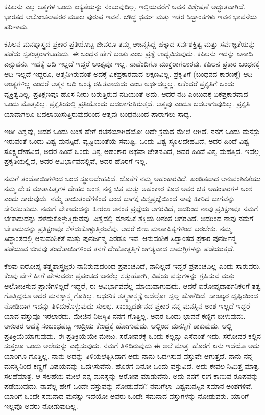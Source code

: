 ಕಪಿಲನು ಎಲ್ಲ ಆತ್ಮಗಳ ಒಂದು ಐಕ್ಯತೆಯನ್ನು ನಂಬುವುದಿಲ್ಲ. ಇಲ್ಲಿಯವರೆಗೆ ಅವನ ವಿಶ್ಲೇಷಣೆ ಅದ್ಭುತವಾಗಿದೆ. ಭಾರತದ ಆಲೋಚನಾಪರರ ಮೂಲ ಪುರುಷ ಇವನೆ. ಬೌದ್ಧ ಧರ್ಮ ಮತ್ತು ಇತರ ಸಿದ್ದಾಂತಗಳು ಇವನ ಭಾವನೆಯ ಪರಿಣಾಮ.

ಕಪಿಲನ ಮನಶ್ಶಾಸ್ತ್ರದ ಪ್ರಕಾರ ಪ್ರತಿಯೊಬ್ಬ ಜೀವರೂ ತಮ್ಮ ಆಜನ್ಮಸಿದ್ದ ಹಕ್ಕಾದ ಸರ್ವಶಕ್ತಿತ್ವ ಮತ್ತು ಸರ್ವಜ್ಞತೆಯನ್ನು ಪಡೆದು ಸ್ವತಂತ್ರರಾಗಬಹುದು. ಈ ಬಂಧನ ಹೇಗೆ ಬಂತು ಎಂಬ ಪ್ರಶ್ನೆ ಉದ್ಭವಿಸುವುದು. ಕಪಿಲನು ಇದನ್ನು ಅನಾದಿ ಎನ್ನುವನು. ಇದಕ್ಕೆ ಆದಿ ಇಲ್ಲದೆ ಇದ್ದರೆ ಅಂತ್ಯವೂ ಇಲ್ಲ. ನಾವೆಂದಿಗೂ ಮುಕ್ತರಾಗಲಾರವು. ಕಪಿಲನ ಪ್ರಕಾರ ಬಂಧನಕ್ಕೆ ಆದಿ ಇಲ್ಲದೆ ಇದ್ದರೂ, ಆತ್ಮನಿಗಿರುವಂತೆ ಅದಕ್ಕೆ ಏಕಪ್ರಕಾರವಾದ ಲಕ್ಷಣವಿಲ್ಲ. ಪ್ರಕೃತಿಗೆ (ಬಂಧನದ ಕಾರಣಕ್ಕೆ) ಆದಿ ಅಂತ್ಯಗಳಿಲ್ಲ ಎಂದರೆ ಆತ್ಮನ ಆದಿ ಅಂತ್ಯ ರಹಿತವಾದುದು ಎಂಬ ಅರ್ಥದಲ್ಲಲ್ಲ. ಏಕೆಂದರೆ ಪ್ರಕೃತಿಗೆ ಒಂದು ವ್ಯಕ್ತಿತ್ವವಿಲ್ಲ. ಪ್ರತಿಕ್ಷಣವೂ ಹೊಸ ನೀರು ಬರುತ್ತಿರುವ ನದಿಯಂತೆ ಅದು. ಆದರೆ ನದಿ ಎಂಬುದಕ್ಕೆ ಏಕಪ್ರಕಾರವಾದ ಒಂದು ಮೊತ್ತವಿಲ್ಲ. ಪ್ರಕೃತಿಯಲ್ಲಿ ಪ್ರತಿಯೊಂದು ಬದಲಾಗುತ್ತಿರುತ್ತದೆ. ಆತ್ಮವು ಎಂದೂ ಬದಲಾಗುವುದಿಲ್ಲ. ಪ್ರಕೃತಿ ಯಾವಾಗಲೂ ಬದಲಾಯಿಸುತ್ತಿರುವುದರಿಂದ ಆತ್ಮವು ಬಂಧನದಿಂದ ಪಾರಾಗಲು ಸಾಧ್ಯ.

ಇಡೀ ವಿಶ್ವವು, ಅದರ ಒಂದು ಅಂಶ ಹೇಗೆ ರಚನೆಯಾಗಿದೆಯೋ ಅದೇ ಕ್ರಮದ ಮೇಲೆ ಆಗಿದೆ. ನನಗೆ ಒಂದು ಮನಸ್ಸು ಇರುವಂತೆ ಒಂದು ವಿಶ್ವ ಮನಸ್ಸಿದೆ. ವ್ಯಷ್ಟಿಯಂತೆಯೆ ಸಮಷ್ಟಿ. ಒಂದು ವಿಶ್ವ ಸ್ಥೂಲದೇಹವಿದೆ, ಅದರ ಹಿಂದೆ ವಿಶ್ವ ಸೂಕ್ಷ್ಮದೇಹವಿದೆ, ಅದರ ಹಿಂದೆ ಒಂದು ವಿಶ್ವ ಅಹಂಕಾರ ಅಥವಾ ಚೇತನವಿದೆ, ಅದರ ಹಿಂದೆ ವಿಶ್ವ ಮಹತ್ತಿದೆ. ಇವೆಲ್ಲ ಪ್ರಕೃತಿಯಲ್ಲಿವೆ, ಅದರ ಆವಿರ್ಭಾವದಲ್ಲಿವೆ, ಅದರ ಹೊರಗೆ ಇಲ್ಲ.

ನಮಗೆ ತಂದೆತಾಯಿಗಳಿಂದ ಬಂದ ಸ್ಥೂಲದೇಹವಿದೆ. ಜೊತೆಗೆ ನಮ್ಮ ಅಹಂಕಾರವಿದೆ. ಖಂಡಿತವಾದ ಆನುವಂಶಿಕತೆಯು ನಮ್ಮ ದೇಹ ಮಾತಾಪಿತೃಗಳ ದೇಹದ ಅಂಶ, ನನ್ನ ಚಿತ್ತ ಮತ್ತು ಅಹಂಕಾರ ಕೂಡ ಅವರ ಚಿತ್ತ ಅಹಂಕಾರಗಳ ಅಂಶ ಎಂದು ಸಾರುವುದು. ನಮ್ಮ ತಾಯಿತಂದೆಗಳಿಂದ ಬಂದ ಭಾಗಕ್ಕೆ ವಿಶ್ವಪ್ರಜ್ಞೆಯಿಂದ ನಾವು ಹೀರಿದ ಭಾಗವನ್ನು ಸೇರಿಸಬಹುದು. ನಮಗೆ ಬೇಕಾದುದನ್ನು ಹೀರಲು ಅನಂತ ಪ್ರಜ್ಞೆಯ ಆಗರವಿದೆ, ಅದರಿಂದ ನಾವು ಪ್ರತಿಕ್ಷಣವೂ ನಮಗೆ ಬೇಕಾದುದನ್ನು ಸೆಳೆದುಕೊಳ್ಳುತ್ತಿರುವೆವು. ವಿಶ್ವದಲ್ಲಿ ಮಾನಸಿಕ ಶಕ್ತಿಯ ಅನಂತ ಆಗರವಿದೆ. ಅದರಿಂದ ನಾವು ನಮಗೆ ಬೇಕಾದುದನ್ನು ಪ್ರತಿಕ್ಷಣವೂ ಸೆಳೆದುಕೊಳ್ಳುತ್ತಿರುವೆವು. ಆದರೆ ಬೀಜ ಮಾತಾಪಿತೃಗಳಿಂದ ಬರಬೇಕು. ನಮ್ಮ ಸಿದ್ಧಾಂತದಲ್ಲಿ ಆನುವಂಶಿಕತೆ ಮತ್ತು ಪುನರ್ಜನ್ಮ ಎರಡೂ ಇವೆ. ಆನುವಂಶಿಕ ಸಿದ್ಧಾಂತದ ಪ್ರಕಾರ ಪುನರ್ಜನ್ಮ ಪಡೆಯುವ ಜೀವವು ತಂದೆತಾಯಿಗಳಿಂದ ತನಗೆ ದೇಹೋತ್ಪತ್ತಿಗೆ ಅಗತ್ಯವಾದ ಸಾಮಗ್ರಿಗಳನ್ನು ಪಡೆಯುತ್ತದೆ.

ಕೆಲವು ಐರೋಪ್ಯ ತತ್ತ್ವಶಾಸ್ತ್ರಜ್ಞರು ನಾನಿರುವುದರಿಂದ ಪ್ರಪಂಚವಿದೆ, ನಾನಿಲ್ಲದೆ ಇದ್ದರೆ ಪ್ರಪಂಚವಿಲ್ಲ ಎಂದು ಸಾರುವರು. ಕೆಲವು ವೇಳೆ ಹೀಗೆ ಹೇಳುವರು: ಪ್ರಪಂಚದ ಜನರೆಲ್ಲ ಸತ್ತುಹೋಗಿ, ವಿಷಯ ವಸ್ತುಗಳನ್ನು ಗ್ರಹಿಸುವ ಮತ್ತು ಆಲೋಚಿಸುವ ಪ್ರಾಣಿಗಳಿಲ್ಲದೆ ಇದ್ದರೆ, ಈ ಆವಿರ್ಭಾವವೆಲ್ಲ ಮಾಯವಾಗುವುದು. ಆದರೆ ಐರೋಪ್ಯ\break ದಾರ್ಶನಿಕರಿಗೆ ತತ್ವ ಗೊತ್ತಿದ್ದರೂ ಅದರ ಮನಶ್ಶಾಸ್ತ್ರ ಗೊತ್ತಿಲ್ಲ. ಆಧುನಿಕ ತತ್ತ್ವಶಾಸ್ತ್ರಕ್ಕೆ ಅದೆಲ್ಲೋ ಸ್ವಲ್ಪ ಹೊಳೆದಿದೆ. ಸಾಂಖ್ಯರ ದೃಷ್ಟಿಯಿಂದ ನೋಡಿದಾಗ ಇದನ್ನು ತಿಳಿದುಕೊಳ್ಳುವುದು ಸುಲಭ. ಸಾಂಖ್ಯದರ್ಶನದ ಪ್ರಕಾರ ನನ್ನ ಮನಸ್ಸಿನ ಅಂಶ ಇಲ್ಲದೆ ಇದ್ದರೆ ಯಾವ ವಸ್ತುವೂ ಇರಲಾರದು. ಮೇಜಿನ ನಿಜಸ್ಥಿತಿ ನನಗೆ ಗೊತ್ತಿಲ್ಲ. ಅದರ ಒಂದು ಭಾವನೆ ಕಣ್ಣಿಗೆ ಬೀಳುವುದು. ಅನಂತರ ಅದಕ್ಕೆ ಸಂಬಂಧಪಟ್ಟ ಇಂದ್ರಿಯ ಕೇಂದ್ರಕ್ಕೆ ಹೋಗುವುದು. ಅಲ್ಲಿಂದ ಮನಸ್ಸಿಗೆ ತಾಕುವುದು. ಅಲ್ಲಿ ಪ್ರತಿಕ್ರಿಯೆಯಾಗುವುದು. ಈ ಪ್ರತಿಕ್ರಿಯೆಯೇ ಮೇಜು. ಸರೋವರಕ್ಕೆ ಒಂದು ಕಲ್ಲನ್ನು ಎಸೆದಂತೆ ಇದು. ಸರೋವರ ಕಲ್ಲಿನ ಸುತ್ತಲೂ ಒಂದು ಅಲೆಯನ್ನು ಎಬ್ಬಿಸುವುದು. ನಮಗೆ ತಿಳಿದಿರುವುದು ಈ ಅಲೆ ಮಾತ್ರ. ಹೊರಗೆ ಏನು ಇದೆಯೊ ಅದು ಯಾರಿಗೂ ಗೊತ್ತಿಲ್ಲ. ನಾನು ಅದನ್ನು ತಿಳಿಯಲೆತ್ನಿಸಿದಾಗ ಅದು ನಾನು ಒದಗಿಸುವ ವಸ್ತುವೇ ಆಗುತ್ತದೆ. ನಾನು ನನ್ನ ಮನಸ್ಸಿನಿಂದ ಕಣ್ಣಿಗೆ ವಿಷಯವನ್ನು ಒದಗಿಸುವೆನು. ಹೊರಗೆ ಏನೋ ಒಂದು ವಸ್ತುವಿದೆ. ಅದು ಕೇವಲ ನಿಮಿತ್ತ ಮಾತ್ರ, ಸಲಹೆಮಾತ್ರ. ಆ ಸಲಹೆಯ ಮೇಲೆ ನನ್ನ ಮನಸ್ಸನ್ನು ಆರೋಪ ಮಾಡುವೆನು. ಅದು ನನಗೆ ಈಗ ಕಾಣುವ ರೂಪವನ್ನು ಪಡೆಯುವುದು. ನಾವೆಲ್ಲ ಹೇಗೆ ಒಂದೇ ವಸ್ತುವನ್ನು ನೋಡುವೆವು? ನಮಗೆಲ್ಲಾ ವಿಶ್ವಮನಸ್ಸಿನ ಸಮಾನ ಅಂಶಗಳಿವೆ. ಯಾರಿಗೆ ಒಂದೇ ಸಮನಾದ ಮನಸ್ಸು ಇದೆಯೋ ಅವರು ಒಂದೇ ಸಮನಾದ ವಸ್ತುಗಳನ್ನು ನೋಡುವರು. ಯಾರಿಗೆ ಇಲ್ಲವೊ ಅವರು ನೋಡುವುದಿಲ್ಲ.

